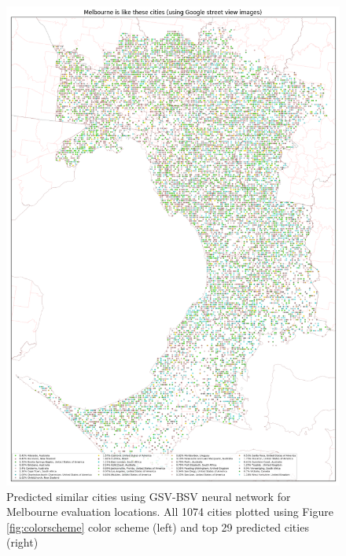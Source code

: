 \documentclass[sageh,times]{sagej}
\begin{document}
\begin{figure}[!htbp]
\includegraphics[scale=0.20]{Images/MelbourneOverallAbrev_street.png} 
\caption{Predicted similar cities using GSV-BSV neural network for Melbourne evaluation locations. All 1074 cities plotted using Figure \ref{fig:colorscheme} color scheme (left) and top 29 predicted cities (right)}    
 \label{fig:melstreet}  
\end{figure} 
\end{document}
